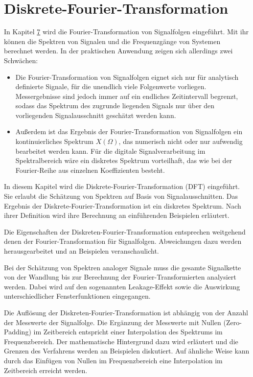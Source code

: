 \chapter{Diskrete-Fourier-Transformation}\label{sec:diskrete-fourier-transformation}

In Kapitel \hyperref[spektrum-von-signalfolgen]{7} wird die Fourier-Transformation von Signalfolgen eingeführt. Mit ihr können die Spektren von Signalen und die Frequenzgänge von Systemen berechnet werden. In der praktischen Anwendung zeigen sich allerdings zwei Schwächen:

\begin{itemize}
\item
  Die Fourier-Transformation von Signalfolgen eignet sich nur für analytisch definierte Signale, für die unendlich viele Folgenwerte vorliegen. Messergebnisse sind jedoch immer auf ein endliches Zeitintervall begrenzt, sodass das Spektrum des zugrunde liegenden Signals nur über den vorliegenden Signalausschnitt geschätzt werden kann.
\item
  Außerdem ist das Ergebnis der Fourier-Transformation von Signalfolgen ein kontinuierliches Spektrum \(X(Ω)\), das numerisch nicht oder nur aufwendig bearbeitet werden kann. Für die digitale Signalverarbeitung im Spektralbereich wäre ein diskretes Spektrum vorteilhaft, das wie bei der Fourier-Reihe aus einzelnen Koeffizienten besteht.
\end{itemize}

In diesem Kapitel wird die Diskrete-Fourier-Transformation (DFT) eingeführt. Sie erlaubt die Schätzung von Spektren auf Basis von Signalausschnitten. Das Ergebnis der Diskrete-Fourier-Transformation ist ein diskretes Spektrum. Nach ihrer Definition wird ihre Berechnung an einführenden Beispielen erläutert.

Die Eigenschaften der Diskreten-Fourier-Transformation entsprechen weitgehend denen der Fourier-Transformation für Signalfolgen. Abweichungen dazu werden herausgearbeitet und an Beispielen veranschaulicht.

Bei der Schätzung von Spektren analoger Signale muss die gesamte Signalkette von der Wandlung bis zur Berechnung der Fourier-Transformierten analysiert werden. Dabei wird auf den sogenannten Leakage-Effekt sowie die Auswirkung unterschiedlicher Fensterfunktionen eingegangen.

Die Auflösung der Diskreten-Fourier-Transformation ist abhängig von der Anzahl der Messwerte der Signalfolge. Die Ergänzung der Messwerte mit Nullen (Zero-Padding) im Zeitbereich entspricht einer Interpolation des Spektrums im Frequenzbereich. Der mathematische Hintergrund dazu wird erläutert und die Grenzen des Verfahrens werden an Beispielen diskutiert. Auf ähnliche Weise kann durch das Einfügen von Nullen im Frequenzbereich eine Interpolation im Zeitbereich erreicht werden.

